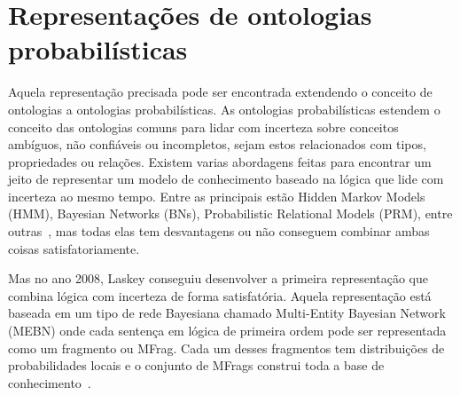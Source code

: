 \section{Representações de ontologias probabilísticas}
\label{sec:resumo}

Aquela representação precisada pode ser encontrada extendendo o conceito de ontologias a ontologias probabilísticas. As ontologias probabilísticas estendem o conceito das ontologias comuns para lidar com incerteza sobre conceitos ambíguos, não confiáveis ou incompletos, sejam estos relacionados com tipos, propriedades ou relações. Existem varias abordagens feitas para encontrar um jeito de representar um modelo de conhecimento baseado na lógica que lide com incerteza ao mesmo tempo. Entre as principais estão Hidden Markov Models (HMM), Bayesian Networks (BNs), Probabilistic Relational Models (PRM), entre outras~\cite{Costa10}, mas todas elas tem desvantagens ou não conseguem combinar ambas coisas satisfatoriamente.

Mas no ano 2008, Laskey conseguiu desenvolver a primeira representação que combina lógica com incerteza de forma satisfatória. Aquela representação está baseada em um tipo de rede Bayesiana chamado Multi-Entity Bayesian Network (MEBN) onde cada sentença em lógica de primeira ordem pode ser representada como um fragmento ou MFrag. Cada um desses fragmentos tem distribuições de probabilidades locais e o conjunto de MFrags construi toda a base de conhecimento~\cite{Laskey08}.